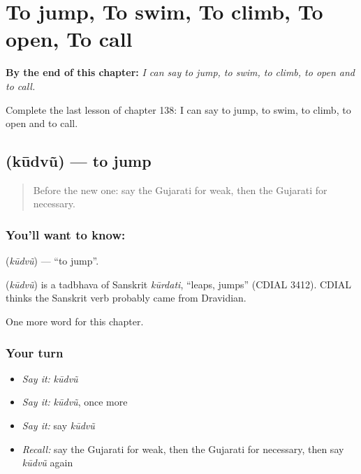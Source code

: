 
\chapter{To jump, To swim, To climb, To open, To call}
\label{ch:gu-to-jump-to-swim-to-climb-to-open-to-call}

\begin{chapteropening}
\textbf{By the end of this chapter:} \emph{I can say to jump, to swim, to climb, to open and to call.}

Complete the last lesson of chapter 138: I can say to jump, to swim, to climb, to open and to call.
\end{chapteropening}

\section[\texorpdfstring{\gu{કૂદવું} (kūdvũ)}{કૂદવું (kūdvũ)}]{ (kūdvũ) — to jump}

\label{lesson:GU-C138-kudvu}



\begin{quote}
Before the new one: say the Gujarati for weak, then the Gujarati for necessary.
\end{quote}

\subsection*{You'll want to know: }
\textbf{} (\emph{kūdvũ}) — \textquotedblleft{}to jump\textquotedblright{}.

\begin{cousinweb}
\textbf{} (\emph{kūdvũ}) is a tadbhava of Sanskrit \emph{kūrdati}, \textquotedblleft{}leaps, jumps\textquotedblright{} (CDIAL 3412). CDIAL thinks the Sanskrit verb probably came from Dravidian.
\end{cousinweb}

\begin{grammarlens}[title={What you've built}]
One more word for this chapter.
\end{grammarlens}

\subsection*{Your turn}
\begin{itemize}
\raggedright
  \item \emph{Say it:} \emph{kūdvũ}
  \item \emph{Say it:} \emph{kūdvũ}, once more
  \item \emph{Say it:} say \emph{kūdvũ}
  \item \emph{Recall:} say the Gujarati for weak, then the Gujarati for necessary, then say \emph{kūdvũ} again
\end{itemize}

